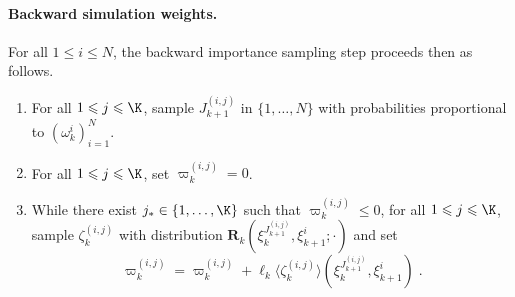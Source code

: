 \documentclass{article}
\newcommand{\N}{N}
\newcommand{\eqsp}{\;}
\newcommand{\epart}[2]{\ensuremath{\xi_{#1}^{#2}}}
\newcommand{\kernelmarg}{\mathbf{R}}
\newcommand{\hatqg}[1]{\mathsf{\ell}_{#1}}
\begin{document}
\paragraph{Backward simulation weights.} For all $1\leqslant i\leqslant \N$, the backward importance sampling step proceeds then as follows.
\begin{enumerate}
\item For all $1\leqslant j\leqslant \K$,   sample $J_{k+1}^{(i,j)}$ in $\{1,\ldots, \N\}$ with probabilities proportional to  $(\omega^{i}_k)_{i=1}^{\N}$. 
\item For all $1\leqslant j\leqslant \K$, set  $\varpi_k^{(i,j)}= 0$.
\item While there exist $j_* \in\{1,\ldots,\K\}$ such that $\varpi_k^{(i,j)} \leqslant 0$, for all $1\leqslant j\leqslant \K$, sample $\zeta_k^{(i,j)}$  with distribution $\kernelmarg_{k}(\epart{k}{J_{k+1}^{(i,j)}}, \epart{k+1}{i};\cdot)$ and set 
$$
\varpi_k^{(i,j)} = \varpi_k^{(i,j)} +  \hatqg{k}\langle \zeta_k^{(i,j)} \rangle(\epart{k}{J_{k+1}^{(i,j)}}, \epart{k+1}{i})\eqsp.
$$
\end{enumerate}
\end{document}
